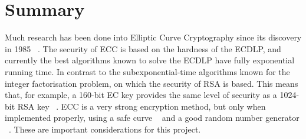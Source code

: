 \documentclass[11pt]{article}
\begin{document}
\section{Summary} \label{Summary}
Much research has been done into Elliptic Curve Cryptography since its discovery in 1985 ~\cite{10.1007/3-540-39799-X_31,koblitz1987elliptic}. 
The security of ECC is based on the hardness of the ECDLP, 
and currently the best algorithms known to solve the ECDLP have fully exponential running time. 
In contrast to the subexponential-time algorithms known for the integer factorisation problem, 
on which the security of RSA is based. 
This means that, for example, a 160-bit EC key provides the same level of security as a 1024-bit RSA key ~\cite{hankerson2003guide,silverman2009arithmetic}. 
ECC is a very strong encryption method, but only when implemented properly, 
using a safe curve ~\cite{bernstein2013safecurves,10.1007/11745853_14}
and a good random number generator ~\cite{hotz2010console}. 
These are important considerations for this project.



\end{document}
